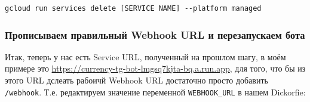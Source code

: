 \documentclass[
]{book}
\begin{document}
\begin{verbatim}
gcloud run services delete [SERVICE NAME] --platform managed
\end{verbatim}

\subsubsection{Прописываем правильный Webhook URL и перезапускаем бота}\label{ux43fux440ux43eux43fux438ux441ux44bux432ux430ux435ux43c-ux43fux440ux430ux432ux438ux43bux44cux43dux44bux439-webhook-url-ux438-ux43fux435ux440ux435ux437ux430ux43fux443ux441ux43aux430ux435ux43c-ux431ux43eux442ux430}

Итак, теперь у нас есть Service URL, полученный на прошлом шагу, в моём примере это \url{https://currency-tg-bot-lmgsq7kjta-bq.a.run.app}, для того, что бы из этого URL дслеать рабоичй Webhook URL достаточно просто добавить \texttt{/webhook}. Т.е. редактируем значение переменной \texttt{WEBHOOK\_URL} в нашем Dickorfie:
\end{document}

